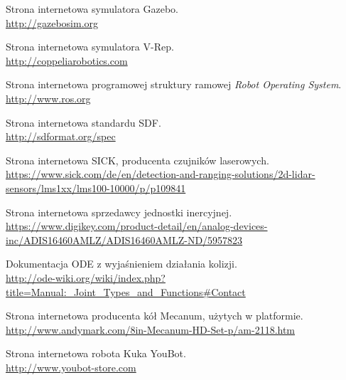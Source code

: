 \begin{thebibliography}{0}
Strona internetowa symulatora Gazebo. \\
\url{http://gazebosim.org}

Strona internetowa symulatora V-Rep. \\
\url{http://coppeliarobotics.com}

Strona internetowa programowej struktury ramowej \emph{Robot Operating System}. \\
\url{http://www.ros.org}

Strona internetowa standardu SDF. \\
\url{http://sdformat.org/spec}

Strona internetowa SICK, producenta czujników laserowych. \\
\url{https://www.sick.com/de/en/detection-and-ranging-solutions/2d-lidar-sensors/lms1xx/lms100-10000/p/p109841}

Strona internetowa sprzedawcy jednostki inercyjnej. \\
\url{https://www.digikey.com/product-detail/en/analog-devices-inc/ADIS16460AMLZ/ADIS16460AMLZ-ND/5957823}

Dokumentacja ODE z wyjaśnieniem działania kolizji. \\
\url{http://ode-wiki.org/wiki/index.php?title=Manual:_Joint_Types_and_Functions#Contact}

Strona internetowa producenta kół Mecanum, użytych w platformie. \\
\url{http://www.andymark.com/8in-Mecanum-HD-Set-p/am-2118.htm}

Strona internetowa robota Kuka YouBot. \\
\url{http://www.youbot-store.com}

\end{thebibliography}
